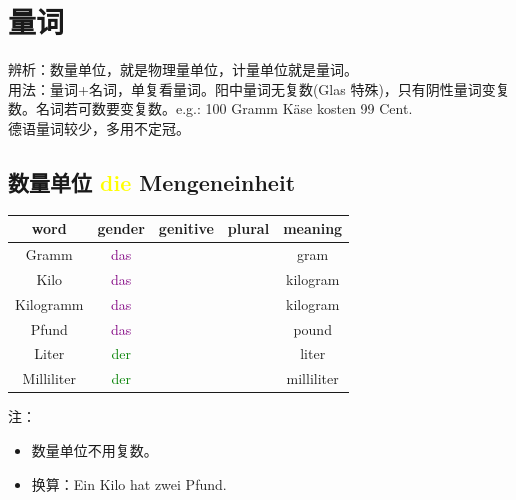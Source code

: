 \section{量词}
\label{sec:num:unit}
辨析：数量单位，就是物理量单位，计量单位就是量词。 \\
用法：量词+名词，单复看量词。阳中量词无复数(Glas 特殊)，只有阴性量词变复数。名词若可数要变复数。e.g.: 100 Gramm Käse kosten 99 Cent. \\
德语量词较少，多用不定冠。 \\
\subsection{数量单位 \textcolor{yellow}{die} Mengeneinheit}
\begin{center}
    \begin{tabular} {|c|c|c|c|c|}
        \hline
        \rowcolor{gray}
        word       & gender                  & genitive & plural & meaning    \\
        \hline
        Gramm      & \textcolor{purple}{das} &          &        & gram       \\
        Kilo       & \textcolor{purple}{das} &          &        & kilogram   \\
        Kilogramm  & \textcolor{purple}{das} &          &        & kilogram   \\
        Pfund      & \textcolor{purple}{das} &          &        & pound      \\
        \hline
        Liter      & \textcolor{green}{der}  &          &        & liter      \\
        Milliliter & \textcolor{green}{der}  &          &        & milliliter \\
        \hline
    \end{tabular}
\end{center}
注：
\begin{itemize}
    \item 数量单位不用复数。
    \item 换算：Ein Kilo hat zwei Pfund.
\end{itemize}

